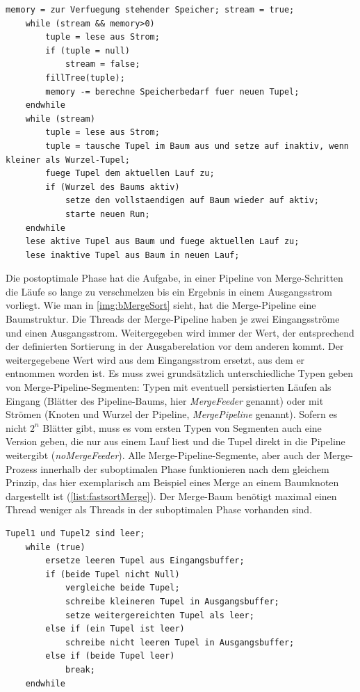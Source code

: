 \documentclass[a4paper,12pt,twoside]{article}
\newcommand{\Fb}[1]{\textit{#1}} %
\begin{document}
{\begin{minipage}{\linewidth}
	\begin{lstlisting}[caption={Fastsort: Erzeugen der Runs in der Suboptimalen Phase}, label=list:fastsortSub]
	memory = zur Verfuegung stehender Speicher; stream = true; 
	while (stream && memory>0) 
		tuple = lese aus Strom;
		if (tuple = null)
			stream = false;
		fillTree(tuple);
		memory -= berechne Speicherbedarf fuer neuen Tupel;
	endwhile
	while (stream)
		tuple = lese aus Strom;
		tuple = tausche Tupel im Baum aus und setze auf inaktiv, wenn kleiner als Wurzel-Tupel;
		fuege Tupel dem aktuellen Lauf zu;
		if (Wurzel des Baums aktiv)
			setze den vollstaendigen auf Baum wieder auf aktiv;
			starte neuen Run;
	endwhile
	lese aktive Tupel aus Baum und fuege aktuellen Lauf zu;
	lese inaktive Tupel aus Baum in neuen Lauf;
	\end{lstlisting}
\end{minipage}

Die postoptimale Phase hat die Aufgabe, in einer Pipeline von Merge-Schritten die Läufe so lange zu verschmelzen bis ein Ergebnis in einem Ausgangsstrom vorliegt. Wie man in \autoref{img:bMergeSort} sieht, hat die Merge-Pipeline eine Baumstruktur. Die Threads der Merge-Pipeline haben je zwei Eingangsströme und einen Ausgangsstrom. Weitergegeben wird immer der Wert, der entsprechend der definierten Sortierung in der Ausgaberelation vor dem anderen kommt. Der weitergegebene Wert wird aus dem Eingangsstrom ersetzt, aus dem er entnommen worden ist. Es muss zwei grundsätzlich unterschiedliche Typen geben von Merge-Pipeline-Segmenten: Typen mit eventuell persistierten Läufen als Eingang (Blätter des Pipeline-Baums, hier \Fb{MergeFeeder} genannt) oder mit Strömen (Knoten und Wurzel der Pipeline, \Fb{MergePipeline} genannt). Sofern es nicht $2^n$ Blätter gibt, muss es vom ersten Typen von Segmenten auch eine Version geben, die nur aus einem Lauf liest und die Tupel direkt in die Pipeline weitergibt (\Fb{noMergeFeeder}). Alle Merge-Pipeline-Segmente, aber auch der Merge-Prozess innerhalb der suboptimalen Phase funktionieren nach dem gleichem Prinzip, das hier exemplarisch am Beispiel eines Merge an einem Baumknoten dargestellt ist (\autoref{list:fastsortMerge}). Der Merge-Baum benötigt maximal einen Thread weniger als Threads in der suboptimalen Phase vorhanden sind.

\begin{minipage}{\linewidth}
	\begin{lstlisting}[caption={Fastsort: Merge in Pipeline}, label=list:fastsortMerge]
	Tupel1 und Tupel2 sind leer; 
	while (true)
		ersetze leeren Tupel aus Eingangsbuffer;
		if (beide Tupel nicht Null)
			vergleiche beide Tupel;
			schreibe kleineren Tupel in Ausgangsbuffer;
			setze weitergereichten Tupel als leer;
		else if (ein Tupel ist leer)
			schreibe nicht leeren Tupel in Ausgangsbuffer;
		else if (beide Tupel leer)
			break;
	endwhile
	\end{lstlisting}
\end{minipage}

}
\end{document}
